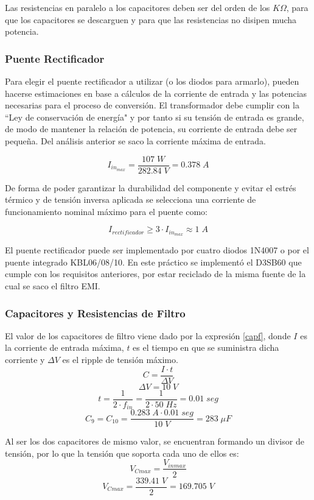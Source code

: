\documentclass[11pt, a4paper]{article}
\begin{document}
Las resistencias en paralelo a los capacitores deben ser del orden de los $K\Omega$, para que los capacitores se descarguen y para que las resistencias no disipen mucha potencia.

\subsubsection{Puente Rectificador}
Para elegir el puente rectificador a utilizar (o los diodos para armarlo), pueden hacerse estimaciones en base a cálculos de la corriente de entrada y las potencias necesarias para el proceso de conversión. El transformador debe cumplir con la ``Ley de conservación de energía" y por tanto si su tensión de entrada es grande, de modo de mantener la relación de potencia, su corriente de entrada debe ser pequeña. Del análisis anterior se saco la corriente máxima de entrada. 


\[ I_{in_{max}} = \frac{107 \; W}{282.84 \; V} = 0.378 \; A \]


De forma de poder garantizar la durabilidad del componente y evitar el estrés térmico y de tensión inversa aplicada se selecciona una corriente de funcionamiento nominal máximo para el puente como:

\[ I_{rectificador} \geq 3 \cdot I_{in_{max}} \approx 1 \;A \]

El puente rectificador puede ser implementado por cuatro diodos 1N4007 o por el puente integrado KBL06/08/10. En este práctico se implementó el D3SB60 que cumple con los requisitos anteriores, por estar reciclado de la misma fuente de la cual se saco el filtro EMI.

\subsubsection{Capacitores y Resistencias de Filtro}
El valor de los capacitores de filtro viene dado por la expresión \ref{capf}, donde $I$ es la corriente de entrada máxima, $t$ es el tiempo en que se suministra dicha corriente y $\Delta V$ es el ripple de tensión máximo. 
\begin{equation}
C = \frac{I \cdot t}{\Delta V}
\label{capf}
\end{equation}
\[ \Delta V = 10 \; V \]
\[ t = \frac{1}{2 \cdot f_{in}} = \frac{1}{2 \cdot 50 \; Hz} = 0.01 \; seg\]
\[ C_9 = C_{10} = \frac{0.283 \; A \cdot 0.01 \; seg}{10 \; V} = 283 \; \mu F \]

Al ser los dos capacitores de mismo valor, se encuentran formando un divisor de tensión, por lo que la tensión que soporta cada uno de ellos es:
\begin{equation}
V_{Cmax} = \frac{V_{inmax}}{2}
\label{VCMAX}
\end{equation}
\[ V_{Cmax} = \frac{339.41 \; V}{2} = 169.705 \; V \]
\end{document}

